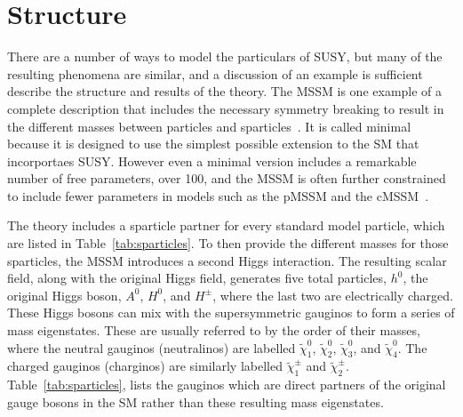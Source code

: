 
\section{Structure}
\label{sec:mssm}

There are a number of ways to model the particulars of \ac{SUSY}, but many of the resulting phenomena are similar, and a discussion of an example is sufficient describe the structure and results of the theory.
The \ac{MSSM} is one example of a complete description that includes the necessary symmetry breaking to result in the different masses between particles and sparticles~\cite{mssm}.
It is called minimal because it is designed to use the simplest possible extension to the \ac{SM} that incorportaes \ac{SUSY}.
However even a minimal version includes a remarkable number of free parameters, over 100, and the \ac{MSSM} is often further constrained to include fewer parameters in models such as the \ac{pMSSM} and the \ac{cMSSM}~\cite{pmssm}.

The theory includes a sparticle partner for every standard model particle, which are listed in Table~\ref{tab:sparticles}.
To then provide the different masses for those sparticles, the \ac{MSSM} introduces a second Higgs interaction.
The resulting scalar field, along with the original Higgs field, generates five total particles, $h^0$, the original Higgs boson, $A^0$, $H^0$, and $H^\pm$, where the last two are electrically charged.
These Higgs bosons can mix with the supersymmetric gauginos to form a series of mass eigenstates.
These are usually referred to by the order of their masses, where the neutral gauginos (neutralinos) are labelled $\tilde{\chi}_1^0$, $\tilde{\chi}_2^0$, $\tilde{\chi}_3^0$, and $\tilde{\chi}_4^0$. 
The charged gauginos (charginos) are similarly labelled $\tilde{\chi}_1^\pm$ and $\tilde{\chi}_2^\pm$. 
Table~\ref{tab:sparticles}, lists the gauginos which are direct partners of the original gauge bosons in the \ac{SM} rather than these resulting mass eigenstates.

